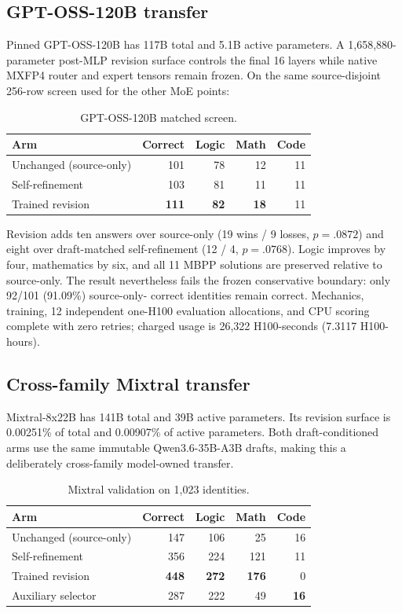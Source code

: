 \documentclass[10pt]{article}
\newcommand{\best}[1]{\textbf{#1}}
\begin{document}
\subsection{GPT-OSS-120B transfer}

Pinned GPT-OSS-120B has 117B total and 5.1B active parameters. A
1,658,880-parameter post-MLP revision surface controls the final 16 layers
while native MXFP4 router and expert tensors remain frozen. On the same
source-disjoint 256-row screen used for the other MoE points:

\begin{table}[h]
\centering
\small
\caption{GPT-OSS-120B matched screen.}
\begin{tabular}{lrrrr}
\toprule
Arm & Correct & Logic & Math & Code\\
\midrule
Unchanged (source-only) & 101 & 78 & 12 & 11\\
Self-refinement & 103 & 81 & 11 & 11\\
Trained revision & \best{111} & \best{82} & \best{18} & 11\\
\bottomrule
\end{tabular}
\label{tab:gptoss}
\end{table}

Revision adds ten answers over source-only (19 wins / 9 losses,
$p=.0872$) and eight over draft-matched self-refinement (12 / 4,
$p=.0768$). Logic improves by four, mathematics by six, and all 11 MBPP
solutions are preserved relative to source-only. The result nevertheless
fails the frozen conservative boundary: only 92/101 (91.09\%) source-only-
correct identities remain correct. Mechanics, training, 12 independent
one-H100 evaluation allocations, and CPU scoring complete with zero retries;
charged usage is 26,322 H100-seconds (7.3117 H100-hours).

\subsection{Cross-family Mixtral transfer}

Mixtral-8x22B has 141B total and 39B active parameters. Its revision surface is
0.00251\% of total and 0.00907\% of active parameters. Both draft-conditioned
arms use the same immutable Qwen3.6-35B-A3B drafts, making this a deliberately
cross-family model-owned transfer.

\begin{table}[h]
\centering
\small
\caption{Mixtral validation on 1,023 identities.}
\begin{tabular}{lrrrr}
\toprule
Arm & Correct & Logic & Math & Code\\
\midrule
Unchanged (source-only) & 147 & 106 & 25 & 16\\
Self-refinement & 356 & 224 & 121 & 11\\
Trained revision & \best{448} & \best{272} & \best{176} & 0\\
Auxiliary selector & 287 & 222 & 49 & \best{16}\\
\bottomrule
\end{tabular}
\label{tab:mixtral}
\end{table}
\end{document}

